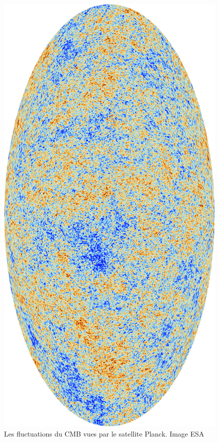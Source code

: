 \begin{figure}[htbp]
        \includegraphics[height=.95\textheight]{img/01/CMB.jpeg} 
        \caption{Les fluctuations du CMB vues par le satellite Planck. 
        Image ESA}
 		\label{fig:cmb}
\end{figure}


